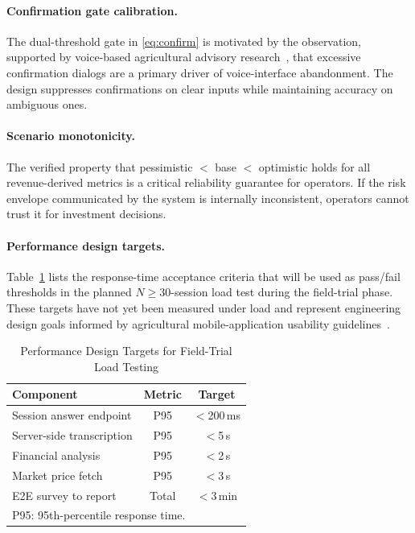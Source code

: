 \documentclass[runningheads]{llncs}
\begin{document}
\paragraph{Confirmation gate calibration.}
The dual-threshold gate in \eqref{eq:confirm} is motivated by the
observation, supported by voice-based agricultural advisory
research~\cite{ref3,ref20}, that excessive confirmation dialogs are a
primary driver of voice-interface abandonment. The design suppresses
confirmations on clear inputs while maintaining accuracy on
ambiguous ones.

\paragraph{Scenario monotonicity.}
The verified property that pessimistic $<$ base $<$ optimistic holds
for all revenue-derived metrics is a critical reliability guarantee
for operators. If the risk envelope communicated by the system is
internally inconsistent, operators cannot trust it for investment
decisions.

\paragraph{Performance design targets.}
Table~\ref{tab:perf} lists the response-time acceptance criteria that
will be used as pass/fail thresholds in the planned
$N{\geq}30$-session load test during the field-trial phase. These
targets have not yet been measured under load and represent engineering
design goals informed by agricultural mobile-application usability
guidelines~\cite{ref20}.

\begin{table}[tbp]
  \caption{Performance Design Targets for Field-Trial Load Testing}
  \label{tab:perf}
  \centering
  \small
  \begin{tabular}{lcc}
    \toprule
    \textbf{Component} & \textbf{Metric} & \textbf{Target} \\
    \midrule
    Session answer endpoint   & P95   & $<$200\,ms \\
    Server-side transcription & P95   & $<$5\,s    \\
    Financial analysis        & P95   & $<$2\,s    \\
    Market price fetch        & P95   & $<$3\,s    \\
    E2E survey to report      & Total & $<$3\,min  \\
    \bottomrule
    \multicolumn{3}{l}{\footnotesize
      P95: 95th-percentile response time.}\\
  \end{tabular}
\end{table}
\end{document}
